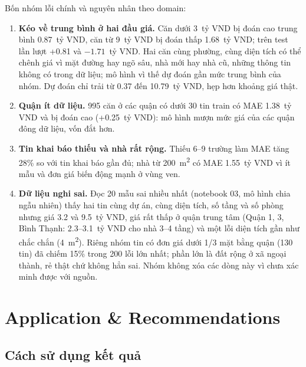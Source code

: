 \documentclass[11pt]{article}
\newcommand{\ty}{tỷ VND}
\newcommand{\mtwo}{m\textsuperscript{2}}
\begin{document}
Bốn nhóm lỗi chính và nguyên nhân theo domain:

\begin{enumerate}
    \item \textbf{Kéo về trung bình ở hai đầu giá.} Căn dưới 3~\ty{} bị đoán cao trung bình 0.87~\ty, căn từ
          9~\ty{} bị đoán thấp 1.68~\ty; trên test lần lượt +0.81 và $-1.71$~\ty. Hai căn cùng phường, cùng diện
          tích có thể chênh giá vì mặt đường hay ngõ sâu, nhà mới hay nhà cũ, những thông tin không có trong dữ
          liệu; mô hình vì thế dự đoán gần mức trung bình của nhóm. Dự đoán chỉ trải từ 0.37 đến 10.79~\ty, hẹp
          hơn khoảng giá thật.
    \item \textbf{Quận ít dữ liệu.} 995 căn ở các quận có dưới 30 tin train có MAE 1.38~\ty{} và bị đoán cao
          (+0.25~\ty): mô hình mượn mức giá của các quận đông dữ liệu, vốn đắt hơn.
    \item \textbf{Tin khai báo thiếu và nhà rất rộng.} Thiếu 6--9 trường làm MAE tăng 28\% so với tin khai báo
          gần đủ; nhà từ 200~\mtwo{} có MAE 1.55~\ty{} vì ít mẫu và đơn giá biến động mạnh ở vùng ven.
    \item \textbf{Dữ liệu nghi sai.} Đọc 20 mẫu sai nhiều nhất (notebook 03, mô hình chia ngẫu nhiên) thấy hai tin cùng dự án, cùng diện tích, số tầng và
          số phòng nhưng giá 3.2 và 9.5~\ty, giá rất thấp ở quận trung tâm (Quận 1, 3, Bình Thạnh: 2.3--3.1~\ty{} cho nhà 3--4 tầng) và một
          lỗi diện tích gần như chắc chắn (4~\mtwo). Riêng nhóm tin có đơn giá dưới 1/3 mặt bằng quận (130 tin)
          đã chiếm 15\% trong 200 lỗi lớn nhất; phần lớn là đất rộng ở xã ngoại thành, rẻ thật chứ không hẳn sai.
          Nhóm không xóa các dòng này vì chưa xác minh được với nguồn.
\end{enumerate}

\section{Application \& Recommendations}

\subsection{Cách sử dụng kết quả}
\end{document}
